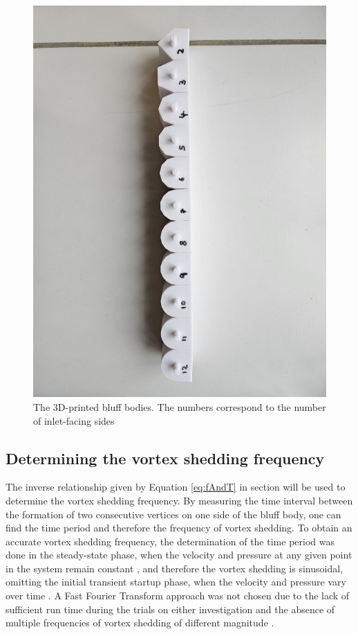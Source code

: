 \begin{figure}[H]
	\centering
	\includegraphics[width=\textwidth]{images/shapes.jpg}
	\caption{The 3D-printed bluff bodies. The numbers correspond to the number of inlet-facing sides}
	\label{fig:shapes}
\end{figure}


\subsection{Determining the vortex shedding frequency}
The inverse relationship given by Equation \eqref{eq:fAndT} in section  will be used to determine the vortex shedding frequency. By measuring the time interval between the formation of two consecutive vertices on one side of the bluff body, one can find the time period and therefore the frequency of vortex shedding. To obtain an accurate vortex shedding frequency, the determination of the time period was done in the steady-state phase, when the velocity and pressure at any given point in the system remain constant \parencite{noauthor_steady_nodate}, and therefore the vortex shedding is sinusoidal, omitting the initial transient startup phase, when the velocity and pressure vary over time \parencite{noauthor_transient_nodate}. A Fast Fourier Transform approach was not chosen due to the lack of sufficient run time during the trials on either investigation and the absence of multiple frequencies of vortex shedding of different magnitude \parencites[10--11]{shi2025vortex}[12]{xu_experimental_2025}.

